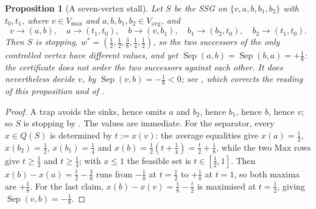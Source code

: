 \documentclass[11pt]{article}
\theoremstyle{plain}
\newtheorem{proposition}[theorem]{Proposition}
\theoremstyle{definition}
\newcommand{\Vmax}{V_{\max}}
\newcommand{\Vavg}{V_{\mathrm{avg}}}
\begin{document}
\begin{proposition}[A seven-vertex stall]\label{prop:transport-stalls}
Let $S$ be the SSG on $\{v,a,b,b_1,b_2\}$ with $t_0,t_1$, where
$v\in\Vmax$ and $a,b,b_1,b_2\in\Vavg$, and
\[
  v\to(a,b),\quad a\to(t_1,t_0),\quad b\to(v,b_1),\quad
  b_1\to(b_2,t_0),\quad b_2\to(t_1,t_0).
\]
Then $S$ is stopping, $w^\ast=(\tfrac12,\tfrac12,\tfrac38,\tfrac14,\tfrac12)$,
so the two successors of the only controlled vertex have different
values, and yet
$\operatorname{Sep}(a,b)=\operatorname{Sep}(b,a)=+\tfrac18$: the certificate
does not order the two successors against each other. It does nevertheless
decide $v$, by $\operatorname{Sep}(v,b)=-\tfrac18<0$; see
, which corrects the reading of this proposition and of
.
\end{proposition}

\begin{proof}
A trap avoids the sinks, hence omits $a$ and $b_2$, hence $b_1$, hence
$b$, hence $v$; so $S$ is stopping by . The values are
immediate. For the separator, every $x\in Q(S)$ is determined by
$t:=x(v)$: the average equalities give $x(a)=\tfrac12$,
$x(b_2)=\tfrac12$, $x(b_1)=\tfrac14$ and
$x(b)=\tfrac12(t+\tfrac14)=\tfrac t2+\tfrac18$, while the two Max rows
give $t\ge\tfrac12$ and $t\ge\tfrac14$; with $x\le1$ the feasible set is
$t\in[\tfrac12,1]$. Then $x(b)-x(a)=\tfrac t2-\tfrac38$ runs from
$-\tfrac18$ at $t=\tfrac12$ to $+\tfrac18$ at $t=1$, so both maxima are
$+\tfrac18$. For the last claim, $x(b)-x(v)=\tfrac18-\tfrac t2$ is maximised at
$t=\tfrac12$, giving $\operatorname{Sep}(v,b)=-\tfrac18$.
\end{proof}
\end{document}
